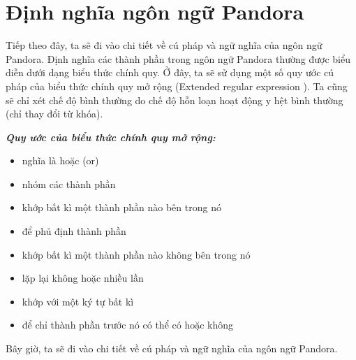 \section{Định nghĩa ngôn ngữ Pandora}
\label{ch2:pandora}

Tiếp theo đây, ta sẽ đi vào chi tiết về cú pháp và ngữ nghĩa của ngôn ngữ Pandora. Định nghĩa các thành phần trong ngôn ngữ Pandora thường được biểu diễn dưới dạng biểu thức chính quy\cite{li2008regular}. Ở đây, ta sẽ sử dụng một số quy ước cú pháp của biểu thức chính quy mở rộng (Extended regular expression \cite{freydenberger2013extended}). Ta cũng sẽ chỉ xét chế độ bình thường do chế độ hỗn loạn hoạt động y hệt bình thường (chỉ thay đổi từ khóa).

\textbf{\textit{Quy ước của biểu thức chính quy mở rộng:}}

\begin{itemize}
    \item{\kw{|} nghĩa là hoặc (or)}
    \item{\kw{( )} nhóm các thành phần}
    \item{\kw{[ ]} khớp bất kì một thành phần nào bên trong nó}
    \item{\kw{$^\wedge$} để phủ định thành phần}
    \item{\kw{[$^\wedge$ ]} khớp bất kì một thành phần nào không bên trong nó}
    \item{\kw{*} lặp lại không hoặc nhiều lần}
    \item{ khớp với một ký tự bất kì}
    \item{ để chỉ thành phần trước nó có thể có hoặc không}
\end{itemize}

Bây giờ, ta sẽ đi vào chi tiết về cú pháp và ngữ nghĩa của ngôn ngữ Pandora.





